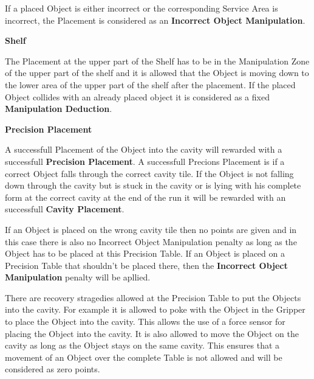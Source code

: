 If a placed Object is either incorrect or the corresponding Service Area is incorrect, the Placement is considered as an \textbf{Incorrect Object Manipulation}. 


\textbf{Shelf}

The Placement at the upper part of the Shelf has to be in the Manipulation Zone of the upper part of the shelf and it is allowed that the Object is moving down to the lower area of the upper part of the shelf after the placement. If the placed Object collides with an already placed object it is considered as a fixed \textbf{Manipulation Deduction}.


\textbf{Precision Placement}

A successfull Placement of the Object into the cavity will rewarded with a successfull \textbf{Precision Placement}. A successfull Precions Placement is if a  correct Object falls through the correct cavity tile. If the Object is not falling down through the cavity but is stuck in the cavity or is lying with his complete form at the correct cavity at the end of the run it will be rewarded with an successfull \textbf{Cavity Placement}.

If an Object is placed on the wrong cavity tile then no points are given and in this case there is also no Incorrect Object Manipulation penalty as long as the Object has to be placed at this Precision Table. If an Object is placed on a Precision Table that shouldn't be placed there, then the \textbf{Incorrect Object Manipulation} penalty will be apllied. 

There are recovery stragedies allowed at the Precision Table to put the Objects into the cavity.
For example it is allowed to poke with the Object in the Gripper to place the Object into the cavity. This  allows the use of a force sensor for placing the Object into the cavity.
It is also allowed to move the Object on the cavity as long as the Object stays on the same cavity. This ensures that a movement of an Object over the complete Table is not allowed and will be considered as zero points.

 


\newpage
%









%

%

